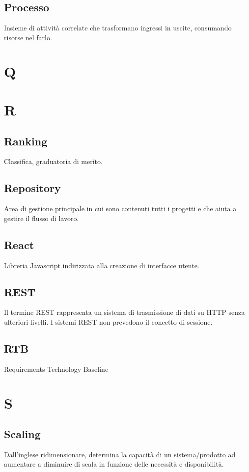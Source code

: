 \documentclass{classes/base}
\begin{document}
        \subsection*{Processo}
        Insieme di attività correlate che trasformano ingressi in uscite, consumando risorse nel farlo.

        \newpage  
    \section{Q}
    \newpage  
    \section{R}
        \subsection*{Ranking} 
        Classifica, graduatoria di merito. 

        \subsection*{Repository}
        Area di gestione principale in cui sono contenuti tutti i progetti e che aiuta a gestire il flusso di lavoro.
        
        \subsection*{React}
        Libreria Javascript indirizzata alla creazione di interfacce utente.

        \subsection*{REST}
        Il termine REST rappresenta un sistema di trasmissione di dati su HTTP senza ulteriori livelli. I sistemi REST non prevedono il concetto di sessione.

        \subsection*{RTB}
        Requirements Technology Baseline
        \newpage  
    \section{S}
        \subsection*{Scaling}       
        Dall'inglese ridimensionare, determina la capacità di un sistema/prodotto ad aumentare a diminuire di scala in funzione delle necessità e disponibilità.
\end{document}
